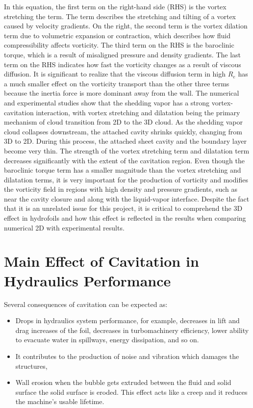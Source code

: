 In this equation, the first term on the right-hand side (RHS) is the vortex 
stretching the term. The term describes the stretching and tilting of a vortex 
caused by velocity gradients. On the right, the second term is the vortex dilation 
term due to volumetric expansion or contraction, which describes how fluid 
compressibility affects vorticity. The third term on the RHS is the baroclinic 
torque, which is a result of misaligned pressure and density gradients. 
The last term on the RHS indicates how fast the vorticity changes as a 
result of viscous diffusion. It is significant to realize that the viscous 
diffusion term in high $R_e$ has a much smaller effect on the vorticity transport 
than the other three terms because the inertia force is more dominant away from 
the wall. The numerical and experimental studies show that the shedding vapor has a 
strong vortex-cavitation interaction, with vortex stretching and dilatation 
being the primary mechanism of cloud transition from 2D to the 3D cloud. 
As the shedding vapor cloud collapses downstream, the attached cavity 
shrinks quickly, changing from 3D to 2D.  During this process, the attached sheet
cavity and the boundary layer become very thin. The strength of the
vortex stretching term and dilatation term decreases significantly
with the extent of the cavitation region. Even though the baroclinic
torque term has a smaller magnitude than the vortex stretching and
dilatation terms, it is very important for the production of vorticity
and modifies the vorticity field in regions with high density and 
pressure gradients, such as near the cavity closure and along with
the liquid-vapor interface. Despite the fact that it is an unrelated issue for this project, 
it is critical to comprehend the 3D effect in hydrofoils and 
how this effect is reflected in the results when comparing 
numerical 2D with experimental results. 

\section{Main Effect of Cavitation in Hydraulics Performance}
Several consequences of cavitation can be expected as:
\begin{itemize}
\item Drops in hydraulics system performance, for example, decreases 
in lift and drag increases of the foil, decreases in turbomachinery 
efficiency, lower ability to evacuate water in spillways, energy dissipation, and so on. 
\item It contributes to the production of noise and vibration which damages the structures,
\item Wall erosion when the bubble gets extruded between the fluid and
  solid surface the solid surface is eroded. This effect acts
  like a creep and it reduces the  machine's usable lifetime.
\end{itemize}

